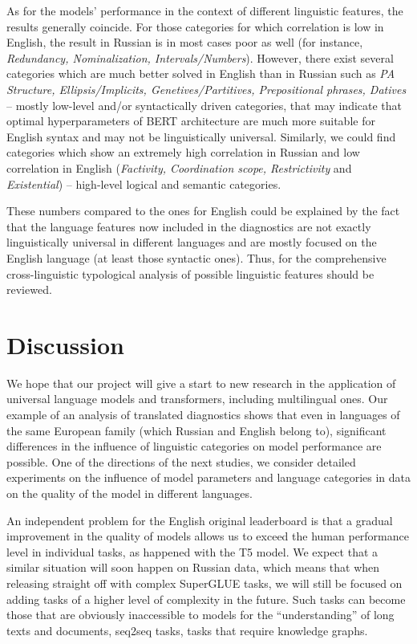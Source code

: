 \documentclass[11pt,a4paper]{article}
\begin{document}
As for the models' performance in the context of different linguistic features, the results generally coincide. For those categories for which correlation is low in English, the result in Russian is in most cases poor as well (for instance, \textit{Redundancy, Nominalization, Intervals/Numbers}). However, there exist several categories which are much better solved in English than in Russian such as \textit{PA Structure, Ellipsis/Implicits, Genetives/Partitives, Prepositional phrases, Datives} -- mostly low-level and/or syntactically driven categories, that may indicate that optimal hyperparameters of BERT architecture are much more suitable for English syntax and may not be linguistically universal. Similarly, we could find categories which show an extremely high correlation in Russian and low correlation in English (\textit{Factivity, Coordination scope, Restrictivity} and \textit{Existential}) -- high-level logical and semantic categories. 

These numbers compared to the ones for English could be explained by the fact that the language features now included in the diagnostics are not exactly linguistically universal in different languages and are mostly focused on the English language (at least those syntactic ones). Thus, for the comprehensive cross-linguistic typological analysis of possible linguistic features should be reviewed.

\section{Discussion} \label{sec:discussion}

We hope that our project will give a start to new research in the application of universal language models and transformers, including multilingual ones. Our example of an analysis of translated diagnostics shows that even in languages of the same European family (which Russian and English belong to), significant differences in the influence of linguistic categories on model performance are possible. One of the directions of the next studies, we consider detailed experiments on the influence of model parameters and language categories in data on the quality of the model in different languages.

An independent problem for the English original leaderboard is that a gradual improvement in the quality of models allows us to exceed the human performance level in individual tasks, as happened with the T5 \cite{t5} model. We expect that a similar situation will soon happen on Russian data, which means that when releasing straight off with complex SuperGLUE tasks, we will still be focused on adding tasks of a higher level of complexity in the future. Such tasks can become those that are obviously inaccessible to models for the ``understanding'' of long texts and documents, seq2seq tasks, tasks that require knowledge graphs.
\end{document}

